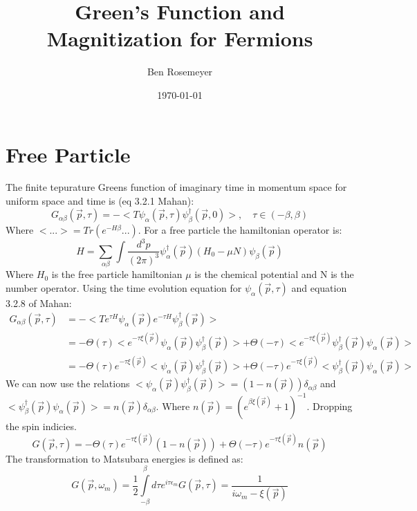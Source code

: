 \documentclass{article}
\begin{document}
\title{Green's Function and Magnitization for Fermions}
\author{Ben Rosemeyer}
\date{\today}
\maketitle

\section*{\bf{Free Particle}}

The finite tepurature Greens function of imaginary time in momentum space for uniform space and time is (eq 3.2.1 Mahan):
\begin{equation}
G_{\alpha\beta}(\vec{p},\tau)=-<T\psi_\alpha(\vec{p},\tau) \psi^\dagger_\beta(\vec{p},0)>,\quad \tau\in(-\beta,\beta)
\end{equation}
Where $<...>=Tr(e^{-H\beta}...)$.
For a free particle the hamiltonian operator is:
\begin{equation}
H=\sum\limits_{\alpha\beta}\int \frac{d^3p}{(2\pi)^3} \psi^\dagger_\alpha(\vec{p})(H_0-\mu N)\psi_\beta(\vec{p})
\end{equation}
Where $H_0$ is the free particle hamiltonian $\mu$ is the chemical potential and N is the number operator. Using the time evolution equation for $\psi_\alpha(\vec{p},\tau)$ and equation 3.2.8 of Mahan:
\begin{align*}
G_{\alpha\beta}(\vec{p},\tau)&=-<Te^{\tau H}\psi_\alpha(\vec{p})e^{-\tau H} \psi^\dagger_\beta(\vec{p})> \\ 
&=-\Theta(\tau)<e^{-\tau\xi(\vec{p})}\psi_\alpha(\vec{p}) \psi^\dagger_\beta(\vec{p})>+\Theta(-\tau)<e^{-\tau\xi(\vec{p})}\psi^\dagger_\beta(\vec{p}) \psi_\alpha(\vec{p})> \\
&=-\Theta(\tau)e^{-\tau\xi(\vec{p})}<\psi_\alpha(\vec{p}) \psi^\dagger_\beta(\vec{p})>+\Theta(-\tau)e^{-\tau\xi(\vec{p})}<\psi^\dagger_\beta(\vec{p}) \psi_\alpha(\vec{p})>
\end{align*}
We can now use the relations $<\psi_\alpha(\vec{p}) \psi^\dagger_\beta(\vec{p})>=(1-n(\vec{p}))\delta_{\alpha\beta}$ and $<\psi^\dagger_\beta(\vec{p}) \psi_\alpha(\vec{p})>=n(\vec{p})\delta_{\alpha\beta}$. Where $n(\vec{p})=(e^{\beta\xi(\vec{p})}+1)^{-1}$. Dropping the spin indicies.
\begin{equation}
G(\vec{p},\tau)=-\Theta(\tau)e^{-\tau\xi(\vec{p})}(1-n(\vec{p}))+\Theta(-\tau)e^{-\tau\xi(\vec{p})}n(\vec{p})
\end{equation}
The transformation to Matsubara energies is defined as:
\begin{equation}
G(\vec{p},\omega_m)=\frac{1}{2}\int\limits_{-\beta}^{\beta}d\tau e^{i\tau\epsilon_m}G(\vec{p},\tau) =\frac{1}{i\omega_m-\xi(\vec{p})}
\end{equation}
\end{document}
